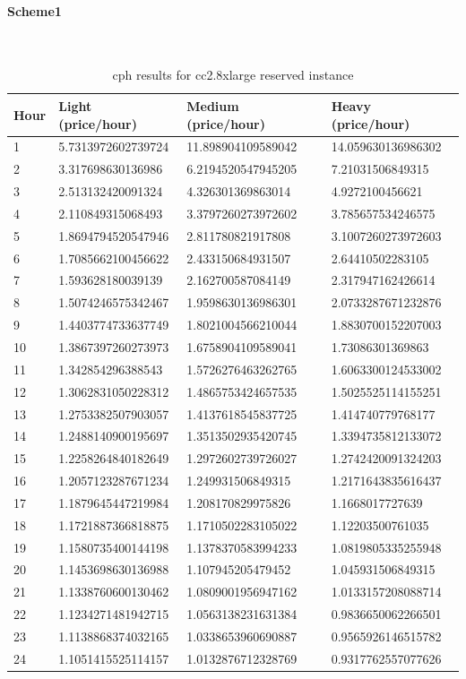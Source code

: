 \documentclass[]{final_report}
\newcommand{\myparagraph}[1]{\paragraph{#1}\mbox{}\\}
\begin{document}
\myparagraph{Scheme1}
\begin{table}[h]
\begin{center}
    \begin{tabular}{| l | l | l | l |}
    \hline
    \textbf{Hour} & \textbf{Light (price/hour)} & \textbf{Medium (price/hour)} & \textbf{Heavy (price/hour)} \\
    \hline
	1&5.7313972602739724&11.898904109589042&14.059630136986302 \\
    \hline
	2&3.317698630136986&6.2194520547945205&7.21031506849315 \\
    \hline
	3&2.513132420091324&4.326301369863014&4.9272100456621 \\
    \hline
	4&2.110849315068493&3.3797260273972602&3.785657534246575 \\    
	\hline
  5&1.8694794520547946&2.811780821917808&3.1007260273972603 \\
  	\hline
  6&1.7085662100456622&2.433150684931507&2.64410502283105 \\
  	\hline 
  7&1.593628180039139&2.162700587084149&2.317947162426614 \\
  \hline 
  8&1.5074246575342467&1.9598630136986301&2.0733287671232876 \\
  \hline
  9&1.4403774733637749&1.8021004566210044&1.8830700152207003 \\
  \hline
  10&1.3867397260273973&1.6758904109589041&1.73086301369863 \\ 
  \hline
  11&1.342854296388543&1.5726276463262765&1.6063300124533002 \\ 
  \hline
  12&1.3062831050228312&1.4865753424657535&1.5025525114155251 \\
  \hline
  13&1.2753382507903057&1.4137618545837725&1.414740779768177 \\
  \hline
  14&1.2488140900195697&1.3513502935420745&1.3394735812133072 \\
  \hline
  15&1.2258264840182649&1.2972602739726027&1.2742420091324203 \\
  \hline
  16&1.2057123287671234&1.249931506849315&1.2171643835616437 \\
  \hline
  17&1.1879645447219984&1.208170829975826&1.1668017727639 \\
  \hline
  18&1.1721887366818875&1.1710502283105022&1.12203500761035 \\ 
  \hline
  19&1.1580735400144198&1.1378370583994233&1.0819805335255948 \\
  \hline
  20&1.1453698630136988&1.107945205479452&1.045931506849315 \\
  \hline
  21&1.1338760600130462&1.0809001956947162&1.0133157208088714 \\
  \hline
  22&1.1234271481942715&1.0563138231631384&0.9836650062266501 \\
  \hline
  23&1.1138868374032165&1.0338653960690887&0.9565926146515782 \\ 
  \hline
  24&1.1051415525114157&1.0132876712328769&0.9317762557077626 \\ 
    \hline
    \end{tabular}
\end{center}
\caption{cph results for cc2.8xlarge reserved instance}
\label{tab:cph:scheme1}
\end{table}
\end{document}
